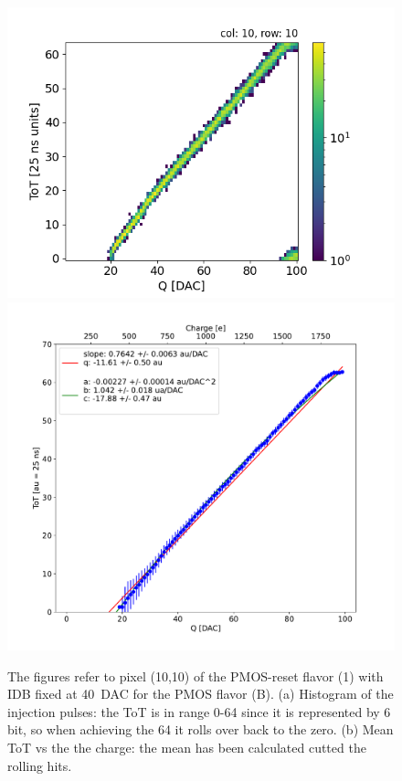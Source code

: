         \begin{figure}[h!]
            \centering
            \includegraphics[width=.49\linewidth]{figures/charaterization/ToT_rollover.png}            
            \includegraphics[width=.49\linewidth]{figures/charaterization/ToT_injection.pdf}
            \label{fig:ToT_vs_charge}
            \caption{The figures refer to pixel (10,10) of the PMOS-reset flavor (1) with IDB fixed at \SI{40}{DAC} for the PMOS flavor (B).
            (a) Histogram of the injection pulses: the ToT is in range 0-64 since it is represented by 6 bit, so when achieving the 64 it rolls over back to the zero. (b) Mean ToT vs the the charge: the mean has been calculated cutted the rolling hits. }
        \end{figure}    

